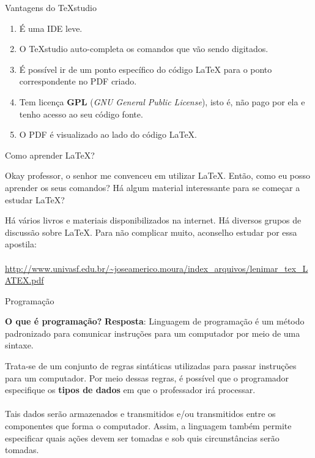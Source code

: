 \documentclass{beamer}
\begin{document}
\begin{frame}{Vantagens do \TeX studio}
\begin{enumerate}
\pause	\item É uma IDE leve.\vspace{0.3cm}
\pause	\item O \TeX studio auto-completa os comandos que vão sendo digitados.\vspace{0.3cm}
\pause	\item É possível ir de um ponto específico do código \LaTeX \hspace{0.03cm} para o ponto correspondente no PDF criado.\vspace{0.3cm}
\pause	\item Tem licença \textbf{GPL} (\textit{GNU General Public License}), isto é, não pago por ela e tenho acesso ao seu código fonte.\vspace{0.3cm}
\pause	\item O PDF é visualizado ao lado do código \LaTeX. 
\end{enumerate}
\end{frame}

\begin{frame}{Como aprender \LaTeX?}
\begin{tcolorbox}[colback=black!5,colframe=black!40!black,title=Pergunta do aluno]
Okay professor, o senhor me convenceu em utilizar \LaTeX. Então, como eu posso aprender os seus comandos? Há algum material interessante para se começar a estudar \LaTeX?
\end{tcolorbox}

\begin{tcolorbox}[colback=black!5,colframe=blue!40!black,title=Resposta do professor legal]
Há vários livros e materiais disponibilizados na internet. Há diversos grupos de discussão sobre \LaTeX. Para não complicar muito, aconselho estudar por essa apostila:\\~\\
\vspace{-0.2cm}\url{http://www.univasf.edu.br/~joseamerico.moura/index_arquivos/lenimar_tex_LATEX.pdf}
\end{tcolorbox}
\end{frame}

\begin{frame}{Programação}
\begin{block}{\textbf{O que é programação?}}
\textbf{Resposta}: Linguagem de programação é um método padronizado para comunicar instruções para um computador por meio de uma sintaxe.
\end{block}
Trata-se de um conjunto de regras sintáticas utilizadas para passar instruções para um computador. Por meio dessas regras, é possível que o programador especifique os \textbf{tipos de dados} em que o professador irá processar. \\~\\

Tais dados serão armazenados e transmitidos e/ou transmitidos entre os componentes que forma o computador. Assim, a linguagem também permite especificar quais ações devem ser tomadas e sob quis circunstâncias serão tomadas.
\end{frame}
\end{document}
